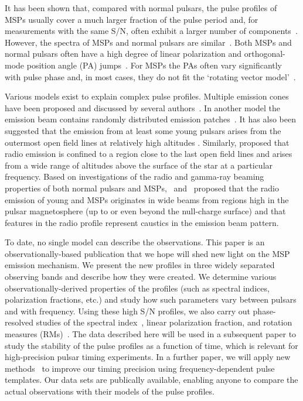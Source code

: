 \documentclass[useAMS,usenatbib]{mn2e}
\begin{document}
It has been shown that, compared with normal pulsars, the pulse profiles of MSPs usually cover a much larger fraction of the pulse period and, for measurements with the same S/N, often exhibit a larger number of components~\citep{Yan11}. 
%
However, the spectra of MSPs and normal pulsars are similar~\citep{Toscano98,Kramer98,Kramer99}.
%
Both MSPs and normal pulsars often have a high degree of linear polarization and orthogonal-mode 
position angle (PA) jumps~\citep[see e.g.,][]{Thorsett90,Navarro97,Stairs99,Manchester04,Ord04}.
%
For MSPs the PAs often vary significantly with pulse phase and, in most cases, they do not fit 
the `rotating vector model'~\citep[RVM,][]{Radhakrishnan69}.

Various models exist to explain complex pulse profiles.  Multiple emission cones have been proposed 
and discussed by several authors~\citep{Rankin83,Kramer94b,Gupta03}. In  another 
model the emission beam contains randomly 
distributed emission patches~\citep{Lyne88,Manchester95_2,Han01}. 
%
It has also been suggested that the emission from at least some young pulsars arises from the outermost 
open field lines at relatively high altitudes \citep{Johnston06}.
%
Similarly, \citet{Kara07} proposed that radio emission is confined to a region close 
to the last open field lines and arises from a wide range of altitudes above the surface of 
the star at a particular frequency.
%
Based on investigations of the radio and gamma-ray beaming properties of both normal 
pulsars and MSPs,~\citet{Manchester05b} and~\citet{Ravi10} proposed that the radio emission 
of young and MSPs originates in wide beams from regions high in the pulsar magnetosphere (up to 
or even beyond the null-charge surface) and that features in the radio profile represent 
caustics in the emission beam pattern.
%

To date, no single model can describe the observations.  
%
This paper is an observationally-based publication that we hope will shed new 
light on the MSP emission mechanism.  
%
We present the new profiles in three widely separated observing bands and describe how they were 
created. We determine various observationally-derived properties of the profiles (such as 
spectral indices, polarization fractions, etc.) and study how such parameters vary 
between pulsars and with frequency. 
%
Using these high S/N profiles, we also carry out phase-resolved studies of 
the spectral index~\citep[e.g.,][]{Lyne88,Kramer94a,Manchester04,Chen07}, linear polarization 
fraction, and rotation measures (RMs)~\citep[e.g.,][]{Ramach04,Han06,Noutsos09}.
%
The data described here will be used in a subsequent paper to study the stability 
of the pulse profiles as a function of time, which is relevant for high-precision pulsar 
timing experiments. In a further paper, we will apply new methods~\citep[e.g.,][]{Pennucci14,Liu14} 
to improve our timing precision using frequency-dependent pulse templates.  
%
Our data sets are publically available, enabling anyone to compare the actual 
observations with their models of the pulse profiles.
%
\end{document}
